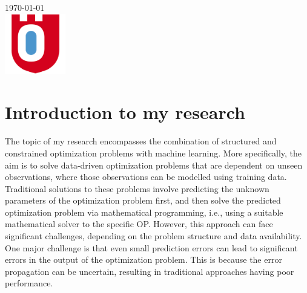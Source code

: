 \documentclass{article}
\begin{document}
\begin{titlepage}


{\large \today}\\[2cm] %


\includegraphics[width=100px, keepaspectratio]{logo_oru2.png}\\[2cm] %
 

\vfill %

\end{titlepage}




\large

\section{Introduction to my research}

The topic of my research encompasses the combination of structured and constrained optimization problems with machine learning. More specifically, the aim is to solve data-driven optimization problems that are dependent on unseen observations, where those observations can be modelled using training data. Traditional solutions to these problems involve predicting the unknown parameters of the optimization problem first, and then solve the predicted optimization problem via mathematical programming, i.e., using a suitable mathematical solver to the specific OP. However, this approach can face significant challenges, depending on the problem structure and data availability. One major challenge is that even small prediction errors can lead to significant errors in the output of the optimization problem. This is because the error propagation can be uncertain, resulting in traditional approaches having poor performance. 
\end{document}

